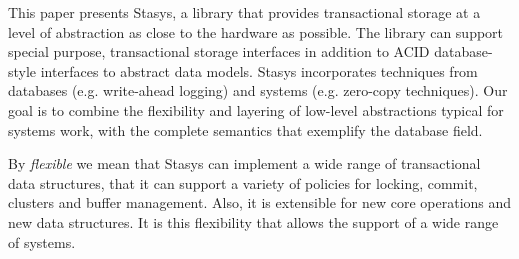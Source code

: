 \documentclass[letterpaper,twocolumn,10pt]{article}
\newcommand{\yad}{Stasys\xspace}
\newcommand{\eat}[1]{}
\begin{document}
\eat{
Examples of real world systems that currently fall into this category
are web search engines, document repositories, large-scale web-email
services, map and trip planning services, ticket reservation systems,
photo and video repositories, bioinformatics, version control systems,
workflow applications, CAD/VLSI applications and directory services.

In short, we believe that a fundamental architectural shift in
transactional storage is necessary before general purpose storage
systems are of practical use to modern applications.
Until this change occurs, databases' imposition of unwanted
abstraction upon their users will restrict system designs and
implementations.
}

%


This paper presents \yad, a library that provides transactional
storage at a level of abstraction as close to the hardware as
possible.  The library can support special purpose, transactional
storage interfaces in addition to ACID database-style interfaces to
abstract data models.  \yad incorporates techniques from databases
(e.g. write-ahead logging) and systems (e.g. zero-copy techniques).
Our goal is to combine the flexibility and layering of low-level
abstractions typical for systems work, with the complete semantics
that exemplify the database field.

By {\em flexible} we mean that \yad{}  can implement a wide
range of transactional data structures, that it can support a variety
of policies for locking, commit, clusters and buffer management.
Also, it is extensible for new core operations
and new data structures. It is this flexibility that allows the
support of a wide range of systems.
\end{document}
